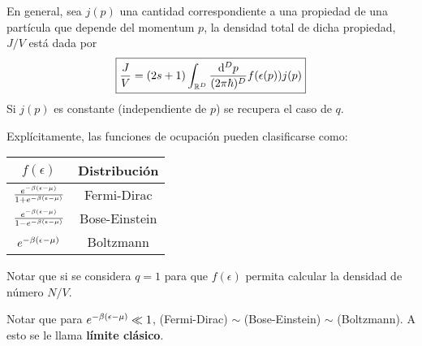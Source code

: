 En general, sea $j(p)$ una cantidad correspondiente a una propiedad de una partícula que depende del momentum $p$, la densidad total de dicha propiedad, $J/V$ está dada por
\begin{equation}
  \boxed{\frac{J}{V}=(2s+1)\int_{\mathbb{R}^D}\frac{\dd^Dp}{(2\pi\hbar)^D}f(\epsilon(p))j(p)}
\end{equation}
Si $j(p)$ es constante (independiente de $p$) se recupera el caso de $q$.

Explícitamente, las funciones de ocupación pueden clasificarse como:

\begin{center}
\begin{tabular}{|c|c|}
\hline
  $f(\epsilon)$ &Distribución \\\hline\hline
  $\frac{e^{-\beta(\epsilon-\mu )}}{1+e^{-\beta(\epsilon-\mu )}}$ & Fermi-Dirac \\\hline 
    $\frac{e^{-\beta(\epsilon-\mu )}}{1-e^{-\beta(\epsilon-\mu )}}$ & Bose-Einstein \\\hline 
      $e^{-\beta(\epsilon-\mu )}$ & Boltzmann \\\hline 
\end{tabular}
\end{center}

Notar que si se considera $q=1$ para que $f(\epsilon)$ permita calcular la densidad de número $N/V$.

Notar que para $e^{-\beta(\epsilon-\mu )}\ll 1$, (Fermi-Dirac) $\sim$ (Bose-Einstein) $\sim$ (Boltzmann). A esto se le llama \textbf{límite clásico}.




















